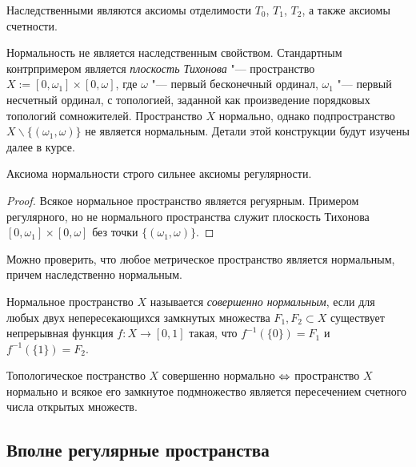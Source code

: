 \begin{note}
    Наследственными являются аксиомы отделимости $T_0$, $T_1$, $T_2$, а также аксиомы счетности.
\end{note}

\begin{note}
    Нормальность не является наследственным свойством. Стандартным контрпримером является \textit{плоскость Тихонова} "--- пространство $X := [0, \omega_1]\times [0, \omega]$, где $\omega$ "--- первый бесконечный ординал, $\omega_1$ "--- первый несчетный ординал, с топологией, заданной как произведение порядковых топологий сомножителей. Пространство $X$ нормально, однако подпространство $X \backslash \lbrace(\omega_1,\omega)\rbrace$ не является нормальным. Детали этой конструкции будут изучены далее в курсе.
\end{note}

\begin{corollary}
    Аксиома нормальности строго сильнее аксиомы регулярности.
\end{corollary}

\begin{proof}
    Всякое нормальное пространство является регуярным. Примером регулярного, но не нормального пространства служит плоскость Тихонова $[0, \omega_1]\times [0, \omega]$ без точки $\lbrace(\omega_1,\omega)\rbrace$.
\end{proof}

\begin{note}
    Можно проверить, что любое метрическое пространство является нормальным, причем наследственно нормальным.
\end{note}

\begin{definition}
    Нормальное пространство $X$ называется \textit{совершенно нормальным}, если для любых двух непересекающихся замкнутых множества $F_1, F_2 \subset X$ существует непрерывная функция $f: X\rightarrow [0, 1]$ такая, что $f^{-1}(\lbrace 0\rbrace) = F_1$ и $f^{-1}(\lbrace 1\rbrace) = F_2$.
\end{definition}

\begin{theorem}
    Топологическое постранство $X$ совершенно нормально $\Leftrightarrow$ пространство $X$ нормально и всякое его замкнутое подмножество является пересечением счетного числа открытых множеств.
\end{theorem}

\subsection{Вполне регулярные пространства}

